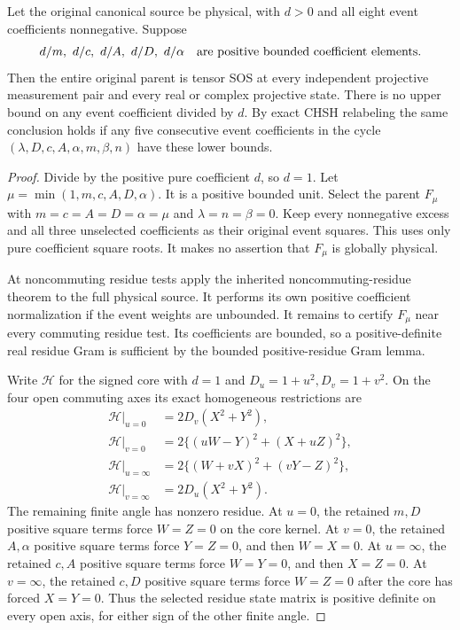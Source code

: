 \begin{theorem}
\label{p80253fe9bc1b:thm:five-retained-events}
Let the original canonical source be physical, with $d>0$ and all eight
event coefficients nonnegative. Suppose
\[
 d/m,\ d/c,\ d/A,\ d/D,\ d/\alpha
 \quad\hbox{are positive bounded coefficient elements}.
\]
Then the entire original parent is tensor SOS at every independent
projective measurement pair and every real or complex projective state.
There is no upper bound on any event coefficient divided by $d$.
By exact CHSH relabeling the same conclusion holds if any five
consecutive event coefficients in the cycle
$(\lambda,D,c,A,\alpha,m,\beta,n)$ have these lower bounds.
\end{theorem}

\begin{proof}
Divide by the positive pure coefficient $d$, so $d=1$.
Let $\mu=\min(1,m,c,A,D,\alpha)$. It is a positive bounded unit.
Select the parent $F_\mu$ with $m=c=A=D=\alpha=\mu$ and
$\lambda=n=\beta=0$. Keep every nonnegative excess and all three
unselected coefficients as their original event squares. This uses only
pure coefficient square roots. It makes no assertion that $F_\mu$ is
globally physical.

At noncommuting residue tests apply
the inherited noncommuting-residue theorem to the full physical source. It
performs its own positive coefficient normalization if the event
weights are unbounded.
It remains to certify $F_\mu$ near every commuting residue test. Its
coefficients are bounded, so a positive-definite real residue Gram is
sufficient by the bounded positive-residue Gram lemma.

Write $\mathcal H$ for the signed core with $d=1$ and
$D_u=1+u^2,D_v=1+v^2$. On the four open commuting axes its exact
homogeneous restrictions are
\[
\begin{aligned}
\mathcal H|_{u=0}&=2D_v(X^2+Y^2),\\
\mathcal H|_{v=0}&=2\{(uW-Y)^2+(X+uZ)^2\},\\
\mathcal H|_{u=\infty}&=2\{(W+vX)^2+(vY-Z)^2\},\\
\mathcal H|_{v=\infty}&=2D_u(X^2+Y^2).
\end{aligned}                                                   \tag{NW1}
\]
The remaining finite angle has nonzero residue. At $u=0$, the retained
$m,D$ positive square terms force $W=Z=0$ on the core kernel. At $v=0$, the retained
$A,\alpha$ positive square terms force $Y=Z=0$, and then $W=X=0$. At $u=\infty$,
the retained $c,A$ positive square terms force $W=Y=0$, and then $X=Z=0$. At
$v=\infty$, the retained $c,D$ positive square terms force $W=Z=0$ after the core
has forced $X=Y=0$. Thus the
selected residue state matrix is positive definite on every open axis,
for either sign of the other finite angle.


\end{proof}
